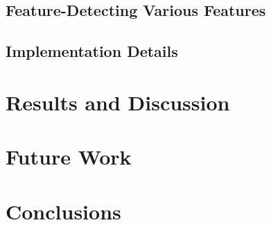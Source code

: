 \documentclass[sigconf]{acmart}
\begin{document}
%

\subsection{Feature-Detecting Various Features}

\subsection{Implementation Details}

\section{Results and Discussion}
\label{sec:results-and-discussion}

\section{Future Work}
\label{sec:future-work}

\section{Conclusions}
\label{sec:conclusions}




\end{document}

